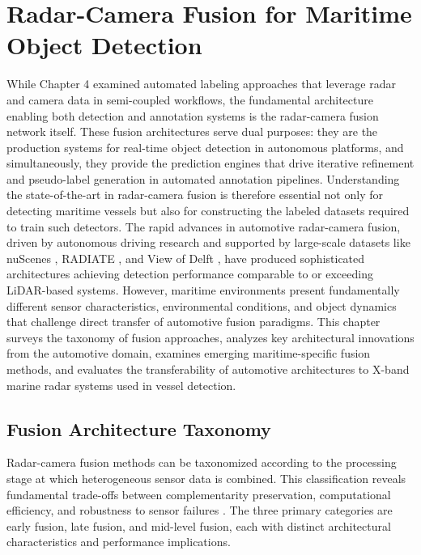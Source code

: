 \section{Radar-Camera Fusion for Maritime Object Detection}\label{sec:fusion}

While Chapter 4 examined automated labeling approaches that leverage radar and camera data in semi-coupled workflows, the fundamental architecture enabling both detection and annotation systems is the radar-camera fusion network itself. These fusion architectures serve dual purposes: they are the production systems for real-time object detection in autonomous platforms, and simultaneously, they provide the prediction engines that drive iterative refinement and pseudo-label generation in automated annotation pipelines. Understanding the state-of-the-art in radar-camera fusion is therefore essential not only for detecting maritime vessels but also for constructing the labeled datasets required to train such detectors. The rapid advances in automotive radar-camera fusion, driven by autonomous driving research and supported by large-scale datasets like nuScenes \cite{Caesar2020nuScenes}, RADIATE \cite{Sheeny2021RADIATE}, and View of Delft \cite{Palffy2022ViewOfDelft}, have produced sophisticated architectures achieving detection performance comparable to or exceeding LiDAR-based systems. However, maritime environments present fundamentally different sensor characteristics, environmental conditions, and object dynamics that challenge direct transfer of automotive fusion paradigms. This chapter surveys the taxonomy of fusion approaches, analyzes key architectural innovations from the automotive domain, examines emerging maritime-specific fusion methods, and evaluates the transferability of automotive architectures to X-band marine radar systems used in vessel detection.



\subsection{Fusion Architecture Taxonomy}

Radar-camera fusion methods can be taxonomized according to the processing stage at which heterogeneous sensor data is combined. This classification reveals fundamental trade-offs between complementarity preservation, computational efficiency, and robustness to sensor failures \cite{Shi2024RadarCameraSurvey}. The three primary categories are early fusion, late fusion, and mid-level fusion, each with distinct architectural characteristics and performance implications.

